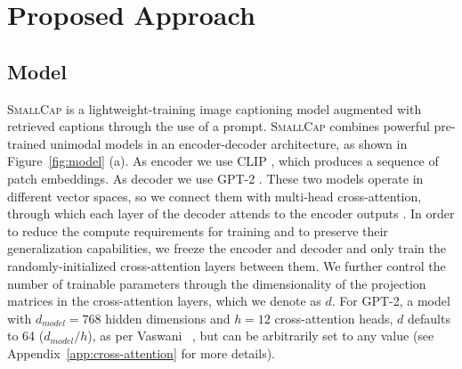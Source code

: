 \documentclass[10pt,twocolumn,letterpaper]{article}
\newcommand{\model}{\textsc{SmallCap}\xspace}
\begin{document}
\section{Proposed Approach}





\subsection{Model}

\model is a lightweight-training image captioning model augmented with retrieved captions through the use of a prompt. 
\model combines powerful pre-trained unimodal models in an encoder-decoder architecture, as shown in Figure~\ref{fig:model} (a). As encoder we use CLIP \cite{radford2021learning}, which produces a sequence of patch embeddings. As decoder we use GPT-2 \cite{radford2019language}.
These two models operate in different vector spaces, so we connect them with multi-head cross-attention, through which each layer of the decoder attends to the encoder outputs \cite{NIPS2017_3f5ee243}. In order to reduce the compute requirements for training and to preserve their generalization capabilities, we freeze the encoder and decoder and only train the randomly-initialized cross-attention layers between them. We %
further control the number of trainable parameters through the dimensionality of the projection matrices in the cross-attention layers, which we denote as $d$. For GPT-2, a model  with $d_{model}=768$ hidden dimensions and $h=12$ cross-attention heads, $d$ defaults to 64 ($d_{model}/h$), as per Vaswani \etal~\cite{NIPS2017_3f5ee243}, but can be arbitrarily set to any value (see Appendix~\ref{app:cross-attention} for more details). %
\end{document}
